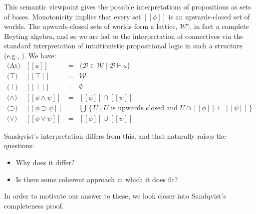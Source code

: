 \documentclass{sn-jnl}
\newcommand{\todo}[1]{\textcolor{red} {[todo: {#1}]}}
\newcommand{\base}[1]{\mathscr{#1}}
\newcommand{\worlds}{\mathcal W}
\newcommand{\note}[1]{\textcolor{red} {[DP-Note: {#1}]}}
\newcommand{\db}[1]{[\![#1]\!]}
\begin{document}
This semantic viewpoint gives the possible interpretations of propositions as sets of bases. Monotonicity implies that every set $\db{\phi}$ is an upwards-closed set of worlds. The upwards-closed sets of worlds form a lattice, $\worlds^\uparrow$, in fact a complete Heyting algebra, and so we are led to the interpretation of connectives via the standard interpretation of intuitionistic propositional logic in such a structure (e.g., \cite{Dummett1977,MM1992,Vickers-TvL1989}). 
We have: 
\[
\begin{array}{lrcl}
    \mbox{(At)} & \db{a} & = & \mbox{$\{\base{B} \in \worlds \mid \base{B}\vdash a \}$} \\ 
    \mbox{($\top$)} & \db{\top} & = & \worlds \\ 
    \mbox{($\bot$)} & \db{\bot} & = &  \emptyset \\ 
    \mbox{($\wedge$)} & \db{\phi\wedge\psi} & = & \db{\phi}\cap\db{\psi} \\ 
    \mbox{($\supset$)} & \db{\phi\supset\psi} & = & \mbox{$\bigcup \,\{\, U \mid U$ is upwards closed and $U \cap \db{\phi} \subseteq \db{\psi} \,\}$}  \\   
    \mbox{($\vee$)} & \db{\phi\vee\psi} & = &  \db{\phi}\cup\db{\psi} 
\end{array}
\] 

Sandqvist's interpretation differs from this, and that naturally raises the questions: 
\begin{itemize}
    \item[--] Why does it differ? 
    \item[--] Is there some coherent approach in which it does fit?
\end{itemize}
In order to motivate our answer to these, we look closer into Sandqvist's completeness proof. 



\end{document}
